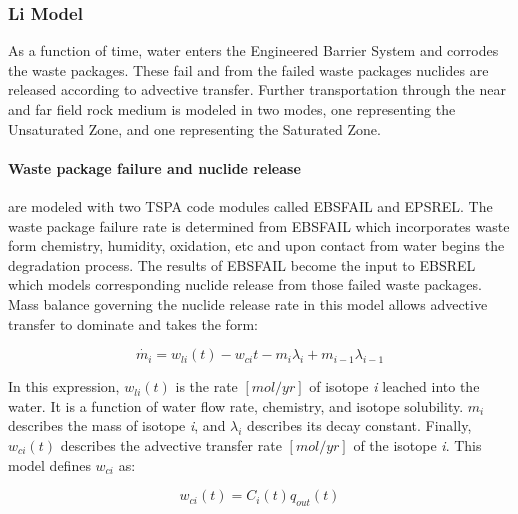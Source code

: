 




\subsubsection{Li Model\cite{li_methodology_2006}}
As a function of time, water enters the Engineered Barrier System and 
corrodes the waste packages.  These fail and from the failed waste 
packages nuclides are released according to advective transfer.  
Further transportation through the near and far field rock medium is 
modeled in two modes, one representing the Unsaturated Zone, and one 
representing the Saturated Zone.

\paragraph{Waste package failure and nuclide release} are modeled with 
two TSPA code modules called EBSFAIL and EPSREL. The waste package 
failure rate is determined from EBSFAIL which incorporates waste form 
chemistry, humidity, oxidation, etc and upon contact from water begins 
the degradation process. The results of EBSFAIL become the input to 
EBSREL which models corresponding nuclide release from those failed 
waste packages. Mass balance governing the nuclide release rate in 
this model allows advective transfer to dominate and takes the form:

\begin{equation}
\dot{m_i}=w_{li}(t)-w_{ci}{t}-m_i\lambda_i+m_{i-1}\lambda_{i-1}\nonumber
\end{equation}

In this expression, $w_{li}(t)$ is the rate $[mol/yr]$ of isotope 
\emph{i} leached into the water.  It is a function of water flow rate, 
chemistry, and isotope solubility. $m_i$ describes the mass of isotope 
\emph{i}, and $\lambda_i$ describes its decay constant. Finally, 
$w_{ci}(t)$ describes the advective transfer rate $[mol/yr]$ of the 
isotope \emph{i}. This model defines $w_{ci}$ as:

\begin{equation}
w_{ci}(t)=C_i(t)q_{out}(t)
\end{equation}

